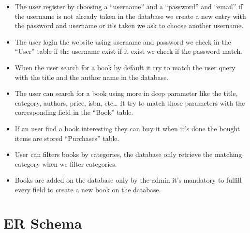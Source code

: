 \documentclass[a4paper,11pt]{article}
\begin{document}
\begin{itemize}
  \item The user register by choosing a “username” and a “password” and “email” if the username is not already taken in the database we create a new entry with the password and username or it’s taken we ask to choose another username.
  \item The user login the website using username and password we check in the “User” table if the username exist if it exist we check if the password match.
  \item When the user search for a book by default it try to match the user query with the title and the author name in the database.
  \item The user can search for a book using more in deep parameter like the title, category, authors, price, isbn, etc… It try to match those parameters with the corresponding field in the “Book” table.
  \item If an user find a book interesting they can buy it when it’s done the bought items are stored “Purchases” table.
  \item User can filters books by categories, the database only retrieve the matching category when we filter categories.
  \item Books are added on the database only by the admin it’s mandatory to fulfill every field to create a new book on the database.
\end{itemize}

\section{ER Schema}

\begin{center}
\end{center}
\end{document}
